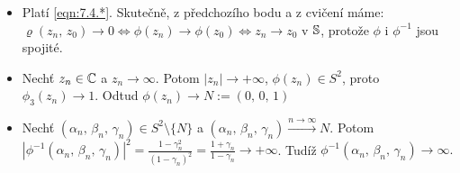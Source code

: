\begin{properties}
\begin{itemize}
    \item Platí \cref{eqn:7.4.*}. Skutečně, z předchozího bodu a z cvičení máme: $\varrho(z_n,\,z_0)\rightarrow0\Leftrightarrow\phi(z_n)\rightarrow\phi(z_0)\Leftrightarrow z_n\rightarrow z_0$ v $\operatorname{\mathbb{S}}$, protože $\phi$ i $\phi^{-1}$ jsou spojité.
    
     \item 
     Nechť $z_n\in \operatorname{\mathbb{C}}  $ a $z_n\rightarrow \infty$. Potom $|z_n|\rightarrow+\infty$, $\phi(z_n)\in S^2$, proto  $\phi_3(z_n)\rightarrow 1$. Odtud $\phi(z_n)\rightarrow N:=(0,\,0,\,1)$
     
     \item
     Nechť $(\alpha_n,\,\beta_n,\,\gamma_n)\in S^2\setminus\{N\}$ a $(\alpha_n,\,\beta_n,\,\gamma_n)\overset{n\to\infty}{\longrightarrow} N$. Potom
     $|\phi^{-1}(\alpha_n,\,\beta_n,\,\gamma_n)|^2=\frac{1-\gamma_n^2}{(1-\gamma_n)^2}=\frac{1+\gamma_n}{1-\gamma_n}\rightarrow+\infty$. Tudíž $\phi^{-1}(\alpha_n,\,\beta_n,\,\gamma_n)\rightarrow\infty.$
\end{itemize}
\end{properties}
